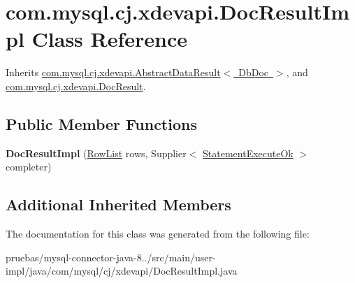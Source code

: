 \hypertarget{classcom_1_1mysql_1_1cj_1_1xdevapi_1_1_doc_result_impl}{}\section{com.\+mysql.\+cj.\+xdevapi.\+Doc\+Result\+Impl Class Reference}
\label{classcom_1_1mysql_1_1cj_1_1xdevapi_1_1_doc_result_impl}


Inherits \mbox{\hyperlink{classcom_1_1mysql_1_1cj_1_1xdevapi_1_1_abstract_data_result}{com.\+mysql.\+cj.\+xdevapi.\+Abstract\+Data\+Result$<$ Db\+Doc $>$}}, and \mbox{\hyperlink{interfacecom_1_1mysql_1_1cj_1_1xdevapi_1_1_doc_result}{com.\+mysql.\+cj.\+xdevapi.\+Doc\+Result}}.

\subsection*{Public Member Functions}
\begin{DoxyCompactItemize}
\item 
\mbox{\label{classcom_1_1mysql_1_1cj_1_1xdevapi_1_1_doc_result_impl_af03d5dc32ec7b79ec200a83c81cebef4}} 
{\bfseries Doc\+Result\+Impl} (\mbox{\hyperlink{interfacecom_1_1mysql_1_1cj_1_1result_1_1_row_list}{Row\+List}} rows, Supplier$<$ \mbox{\hyperlink{classcom_1_1mysql_1_1cj_1_1protocol_1_1x_1_1_statement_execute_ok}{Statement\+Execute\+Ok}} $>$ completer)
\end{DoxyCompactItemize}
\subsection*{Additional Inherited Members}


The documentation for this class was generated from the following file\+:\begin{DoxyCompactItemize}
\item 
pruebas/mysql-\/connector-\/java-\/8../src/main/user-\/impl/java/com/mysql/cj/xdevapi/Doc\+Result\+Impl.\+java\end{DoxyCompactItemize}
